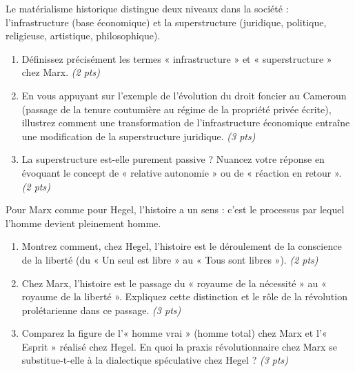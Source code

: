 \documentclass[11pt]{article}
\begin{document}
\begin{exercice}
Le matérialisme historique distingue deux niveaux dans la société : l'infrastructure (base économique) et la superstructure (juridique, politique, religieuse, artistique, philosophique).

\begin{enumerate}
    \item Définissez précisément les termes « infrastructure » et « superstructure » chez Marx. \textit{(2 pts)}
    \item En vous appuyant sur l'exemple de l'évolution du droit foncier au Cameroun (passage de la tenure coutumière au régime de la propriété privée écrite), illustrez comment une transformation de l'infrastructure économique entraîne une modification de la superstructure juridique. \textit{(3 pts)}
    \item La superstructure est-elle purement passive ? Nuancez votre réponse en évoquant le concept de « relative autonomie » ou de « réaction en retour ». \textit{(2 pts)}
\end{enumerate}
\end{exercice}

\begin{exercice}
Pour Marx comme pour Hegel, l'histoire a un sens : c'est le processus par lequel l'homme devient pleinement homme.

\begin{enumerate}
    \item Montrez comment, chez Hegel, l'histoire est le déroulement de la conscience de la liberté (du « Un seul est libre » au « Tous sont libres »). \textit{(2 pts)}
    \item Chez Marx, l'histoire est le passage du « royaume de la nécessité » au « royaume de la liberté ». Expliquez cette distinction et le rôle de la révolution prolétarienne dans ce passage. \textit{(3 pts)}
    \item Comparez la figure de l'« homme vrai » (homme total) chez Marx et l'« Esprit » réalisé chez Hegel. En quoi la praxis révolutionnaire chez Marx se substitue-t-elle à la dialectique spéculative chez Hegel ? \textit{(3 pts)}
\end{enumerate}
\end{exercice}
\end{document}

